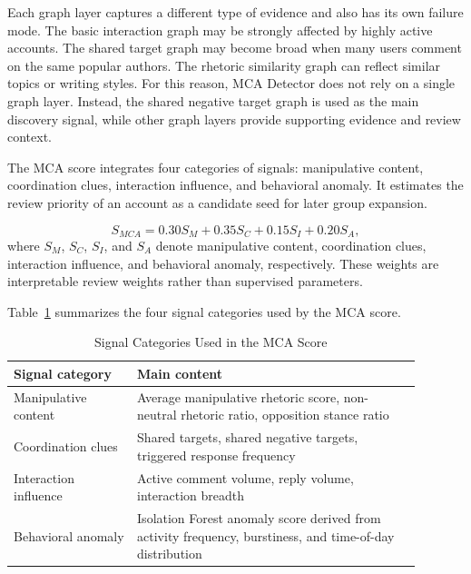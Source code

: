 \documentclass[conference]{IEEEtran}
\begin{document}
Each graph layer captures a different type of evidence and also has its own failure mode. The basic interaction graph may be strongly affected by highly active accounts. The shared target graph may become broad when many users comment on the same popular authors. The rhetoric similarity graph can reflect similar topics or writing styles. For this reason, MCA Detector does not rely on a single graph layer. Instead, the shared negative target graph is used as the main discovery signal, while other graph layers provide supporting evidence and review context.

The MCA score integrates four categories of signals: manipulative content, coordination clues, interaction influence, and behavioral anomaly. It estimates the review priority of an account as a candidate seed for later group expansion.

\begin{equation}
S_{MCA}=0.30S_M+0.35S_C+0.15S_I+0.20S_A,
\end{equation}
where $S_M$, $S_C$, $S_I$, and $S_A$ denote manipulative content, coordination clues, interaction influence, and behavioral anomaly, respectively. These weights are interpretable review weights rather than supervised parameters.

Table~\ref{tab:mca-score} summarizes the four signal categories used by the
MCA score.

\begin{table}[htbp]
\caption{Signal Categories Used in the MCA Score}
\label{tab:mca-score}
\centering
\begin{tabular}{p{0.27\linewidth} p{0.62\linewidth}}
\toprule
\textbf{Signal category} & \textbf{Main content} \\
\midrule
Manipulative content & Average manipulative rhetoric score, non-neutral rhetoric ratio, opposition stance ratio \\
Coordination clues & Shared targets, shared negative targets, triggered response frequency \\
Interaction influence & Active comment volume, reply volume, interaction breadth \\
Behavioral anomaly & Isolation Forest anomaly score derived from activity frequency, burstiness, and time-of-day distribution \\
\bottomrule
\end{tabular}
\end{table}
\end{document}
